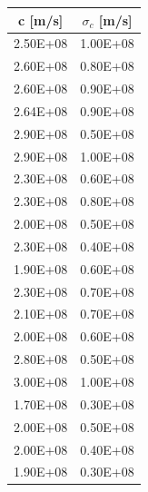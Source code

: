 \documentclass[openright]{article}
\begin{document}
        \begin{minipage}{\textwidth}
             \begin{minipage}[b]{0.35\linewidth}
                \begin{tabular}{  c  c  } 
                    
                    \toprule
                     c [m/s] &  $\sigma_c$ [m/s] \\ 
                    \midrule
                    2.50E+08	&    1.00E+08 \\
                    2.60E+08	&    0.80E+08 \\
                    2.60E+08	&    0.90E+08 \\
                    2.64E+08	&    0.90E+08 \\
                    2.90E+08	&    0.50E+08 \\
                    2.90E+08	&    1.00E+08 \\
                    2.30E+08	&    0.60E+08 \\
                    2.30E+08	&    0.80E+08 \\
                    2.00E+08	&    0.50E+08 \\
                    2.30E+08	&    0.40E+08 \\
                    1.90E+08	&    0.60E+08 \\
                    2.30E+08	&    0.70E+08 \\
                    2.10E+08	&    0.70E+08 \\
                    2.00E+08	&    0.60E+08 \\
                    2.80E+08	&    0.50E+08 \\
                    3.00E+08	&    1.00E+08 \\
                    1.70E+08	&    0.30E+08 \\
                    2.00E+08	&    0.50E+08 \\
                    2.00E+08	&    0.40E+08 \\
                    1.90E+08	&    0.30E+08 \\
        

\end{tabular}
\end{minipage}
\end{minipage}
\end{document}
